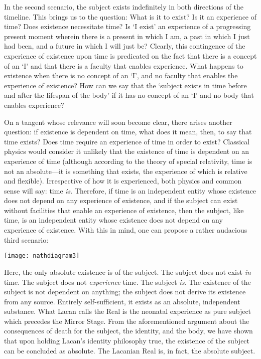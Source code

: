 In the second scenario, the subject exists indefinitely in both
directions of the timeline. This brings us to the question: What is it
to exist? Is it an experience of time? Does existence necessitate time?
Is `I exist' an experience of a progressing present moment wherein there
is a present in which I am, a past in which I just had been, and a
future in which I will just be? Clearly, this contingence of the
experience of existence upon time is predicated on the fact that there
is a concept of an `I' and that there is a faculty that enables
experience. What happens to existence when there is no concept of an
`I', and no faculty that enables the experience of existence? How can we
say that the `subject exists in time before and after the lifespan of
the body' if it has no concept of an `I' and no body that enables
experience?

On a tangent whose relevance will soon become clear, there arises
another question: if existence is dependent on time, what does it mean,
then, to say that time exists? Does time require an experience of time
in order to exist? Classical physics would consider it unlikely that the
existence of time is dependent on an experience of time (although
according to the theory of special relativity, time is not an absolute---it is something that
exists, the experience of which is relative and flexible). Irrespective
of how it is experienced, both physics and common sense will say: time
\emph{is}. Therefore, if time is an independent entity whose existence
does not depend on any experience of existence, and if the subject can
exist without facilities that enable an experience of existence, then
the subject, like time, is an independent entity whose existence does
not depend on any experience of existence. With this in mind, one can
propose a rather audacious third scenario:
\begin{center}
\texttt{[image: nathdiagram3]}
\end{center}
Here,
the only absolute existence is of the subject. The subject does not
exist \emph{in} time. The subject does not \emph{experience} time. The
subject \emph{is}. The existence of the subject is not dependent on
anything; the subject does not derive its existence from any source.
Entirely self-sufficient, it exists as an absolute, independent
substance. What Lacan calls the Real is the neonatal experience as pure
subject which precedes the Mirror Stage. From the aforementioned
argument about the consequences of death for the subject, the identity,
and the body, we have shown that upon holding Lacan's identity
philosophy true, the existence of the subject can be concluded as
absolute. The Lacanian Real is, in fact, the absolute subject.


